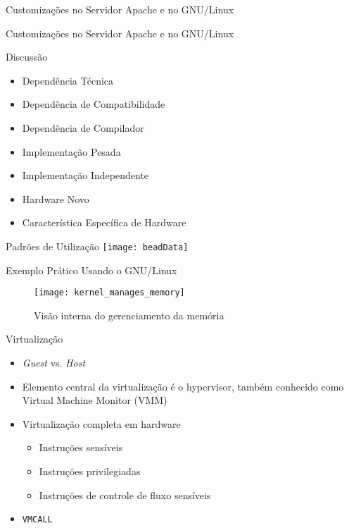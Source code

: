 \documentclass[xcolor={usenames,svgnames,dvipsnames},brazil,english,12pt,aspectratio=149]{beamer}
\begin{document}
\begin{frame}{Customizações no Servidor Apache e no GNU/Linux}
  
\end{frame}

\begin{frame}{Customizações no Servidor Apache e no GNU/Linux}
  
\end{frame}

\begin{frame}{Discussão}
  \begin{itemize}
    \item Dependência Técnica
    \item Dependência de Compatibilidade
    \item Dependência de Compilador
    \item Implementação Pesada
    \item Implementação Independente
    \item Hardware Novo
    \item Característica Específica de Hardware
  \end{itemize}
\end{frame}

\begin{frame}{Padrões de Utilização}
  \centering
  \texttt{[image: beadData]}
\end{frame}

\begin{frame}{Exemplo Prático Usando o GNU/Linux}
  \begin{figure}[!h]
    \centering
    \texttt{[image: kernel\_manages\_memory]}
    \caption*{Visão interna do gerenciamento da memória}
  \end{figure}
\end{frame}

\begin{frame}{Virtualização}
    \begin{itemize}
      \item \emph{Guest} vs. \emph{Host}
      \item Elemento central da virtualização é o hypervisor, também conhecido
            como Virtual Machine Monitor (VMM)
      \item Virtualização completa em hardware
          \begin{itemize}
          \item Instruções sensíveis
          \item Instruções privilegiadas
          \item Instruções de controle de fluxo sensíveis
      \end{itemize}
      \item \texttt{VMCALL}
    \end{itemize}
\end{frame}
\end{document}

